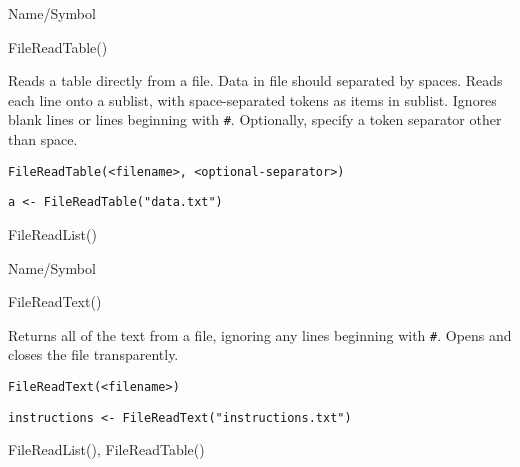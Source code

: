 \rl


\begin{desc}{Name/Symbol}
\item[Name/Symbol]	FileReadTable()

\item[Description]	Reads a table directly from a file. Data in file should
		separated by spaces.  Reads each line onto a sublist,
		with space-separated tokens as items in sublist.  Ignores
		blank lines or lines beginning with \verb+#+. Optionally,
		specify a token separator other than space.

\item[Usage]
\begin{verbatim}
FileReadTable(<filename>, <optional-separator>)
\end{verbatim}

\item[Example]
\begin{verbatim}
a <- FileReadTable("data.txt")
\end{verbatim}

\item[See Also]	FileReadList()
\end{desc}

\rl




\begin{desc}{Name/Symbol}
\item[Name/Symbol]	FileReadText()

\item[Description]	Returns all of the text from a file, ignoring any lines
		beginning with \verb+#+. Opens and closes the file transparently.

\item[Usage]
\begin{verbatim}
FileReadText(<filename>)
\end{verbatim}

\item[Example]
\begin{verbatim}
instructions <- FileReadText("instructions.txt")
\end{verbatim}

\item[See Also]	FileReadList(), FileReadTable()
\end{desc}

\rl



